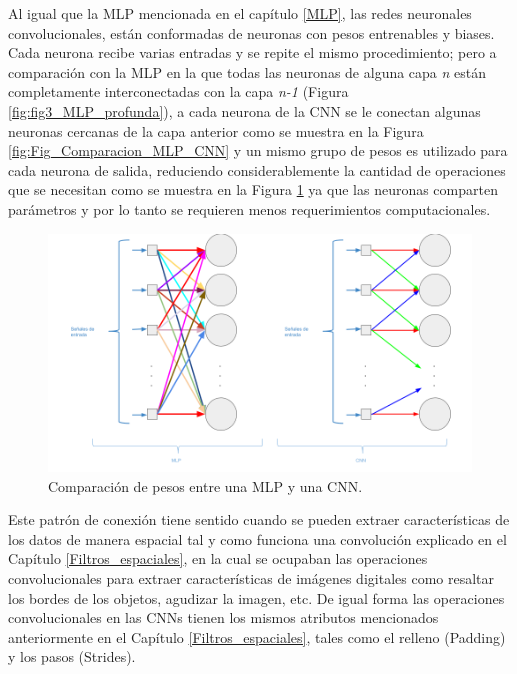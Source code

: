 \begin{onehalfspacing}
Al igual que la MLP mencionada en el capítulo \ref{MLP}, las redes neuronales convolucionales, están conformadas de neuronas con pesos entrenables y biases. Cada neurona recibe varias entradas y se repite el mismo procedimiento; pero a comparación con la MLP en la que todas las neuronas de alguna capa \textit{n} están completamente interconectadas con la capa \textit{n-1} (Figura \ref{fig:fig3_MLP_profunda}), a cada neurona de la CNN se le conectan algunas neuronas cercanas de la capa anterior como se muestra en la Figura \ref{fig:Fig_Comparacion_MLP_CNN} y un mismo grupo de pesos es utilizado para cada neurona de salida, reduciendo considerablemente la cantidad de operaciones que se necesitan como se muestra en la Figura \ref{fig:Fig_Compartiendo_pesos} ya que las neuronas comparten parámetros y por lo tanto se requieren menos requerimientos computacionales.\\

\begin{figure}[th]
	\centering
	\includegraphics[width=14cm,keepaspectratio]{XX_Figures/Fig_Compartiendo_pesos.png}
	\caption{\footnotesize Comparación de pesos entre una MLP y una CNN.}
	\label{fig:Fig_Compartiendo_pesos}
\end{figure}



Este patrón de conexión tiene sentido cuando se pueden extraer características de los datos de manera espacial tal y como funciona una convolución explicado en el Capítulo \ref{Filtros_espaciales}, en la cual se ocupaban las operaciones convolucionales para extraer características de imágenes digitales como resaltar los bordes de los objetos, agudizar la imagen, etc. De igual forma las operaciones convolucionales en las CNNs tienen los mismos atributos mencionados anteriormente en el Capítulo \ref{Filtros_espaciales}, tales como el relleno (Padding) y los pasos (Strides).\\


\end{onehalfspacing}
